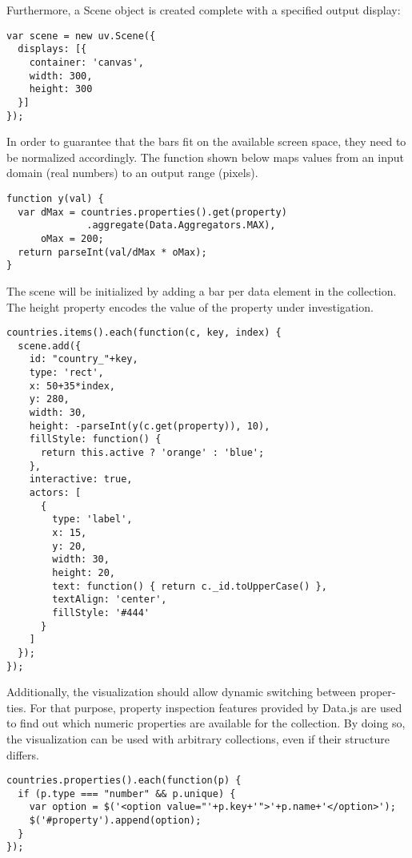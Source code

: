 \begin{english}
\SuperPar Furthermore, a Scene object is created complete with a specified output display:

\begin{verbatim}
var scene = new uv.Scene({
  displays: [{
    container: 'canvas',
    width: 300,
    height: 300
  }]
});
\end{verbatim}

\SuperPar In order to guarantee that the bars fit on the available screen space, they need to be normalized accordingly. The function shown below maps values from an input domain (real numbers) to an output range (pixels).

\begin{verbatim}
function y(val) {
  var dMax = countries.properties().get(property)
              .aggregate(Data.Aggregators.MAX),
      oMax = 200;
  return parseInt(val/dMax * oMax);
}
\end{verbatim}


\SuperPar The scene will be initialized by adding a bar per data element in the collection. The height property encodes the value of the property under investigation.

\begin{verbatim}  
countries.items().each(function(c, key, index) {
  scene.add({
    id: "country_"+key,
    type: 'rect',
    x: 50+35*index,
    y: 280,
    width: 30,
    height: -parseInt(y(c.get(property)), 10),
    fillStyle: function() {
      return this.active ? 'orange' : 'blue'; 
    },
    interactive: true,
    actors: [
      {
        type: 'label',
        x: 15,
        y: 20,
        width: 30,
        height: 20,
        text: function() { return c._id.toUpperCase() },
        textAlign: 'center',
        fillStyle: '#444'
      }
    ]
  });
});
\end{verbatim}

\SuperPar Additionally, the visualization should allow dynamic switching between properties. For that purpose, property inspection features provided by Data.js are used to find out which numeric properties are available for the collection. By doing so, the visualization can be used with arbitrary collections, even if their structure differs.

\begin{verbatim}
countries.properties().each(function(p) {
  if (p.type === "number" && p.unique) {
    var option = $('<option value="'+p.key+'">'+p.name+'</option>');
    $('#property').append(option);
  }
});
\end{verbatim}


\end{english}

